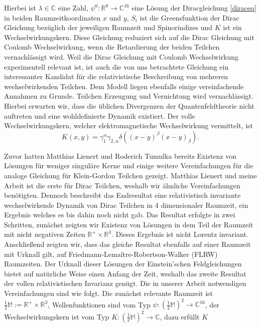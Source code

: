 \documentclass[a4paper,12pt]{article}
\begin{document}
Hierbei ist \(\lambda\in\mathbb{C}\) eine Zahl, \(\psi^0:\mathbb{R}^8\rightarrow \mathbb{C}^{16}\) eine Lösung der Diracgleichung \eqref{diraceq} in beiden 
Raumzeitkoordinaten \(x\) und \(y\), \(S_i\)
ist die Greensfunktion der Dirac Gleichung bezüglich der jeweiligen Raumzeit und Spinorindizes und \(K\) ist ein Wechselwirkungskern.
Diese Gleichung reduziert sich auf die Dirac Gleichung mit Coulomb Wechselwirkung, wenn die Retardierung der beiden Teilchen
vernachlässigt wird. Weil die Dirac Gleichung mit Coulomb Wechselwirkung experimentell relevant ist, ist auch die von uns betrachtete
Gleichung ein interessanter Kandidat für die relativistische Beschreibung von mehreren wechselwirkenden Teilchen.
Dem Modell liegen ebenfalls einige vereinfachende Annahmen zu Grunde. Teilchen Erzeugung und Vernichtung wird vernachlässigt.
Hierbei erwarten wir, dass die üblichen Divergenzen der Quantenfeldtheorie nicht auftreten und eine wohldefinierte Dynamik existiert. 
Der volle Wechselwirkungskern, welcher elektromagnetische Wechselwirkung vermittelt, ist
\begin{equation}
K(x,y)=\gamma_1^\alpha \gamma_{2,\alpha} \delta((x-y)^\beta(x-y)_{\beta}).
\end{equation}

Zuvor hatten Matthias Lienert und Roderich Tumulka bereits Existenz von Lösungen für weniger singuläre Kerne und einige weitere Vereinfachungen
 für die analoge Gleichung für Klein-Gordon
Teilchen gezeigt. Matthias Lienert und meine Arbeit ist die erste für Dirac Teilchen, weshalb wir ähnliche Vereinfachungen benötigten. Dennoch
beschreibt das Endresultat eine relativistisch invariante wechselwirkende Dynamik von Dirac Teilchen in 4 dimensionaler Raumzeit, ein
Ergebnis welches es bis dahin noch nicht gab. Das Resultat erfolgte in zwei Schritten, zunächst zeigten wir Existenz von Lösungen 
in dem Teil der Raumzeit mit nicht negativen Zeiten \(\mathbb{R}^+\times\mathbb{R}^3\). Dieses Ergebnis ist nicht Lorentz invariant.
Anschließend zeigten wir, dass das gleiche Resultat ebenfalls auf einer Raumzeit mit Urknall gilt, auf Friedmann-Lemaître-Robertson-Walker (FLRW)
Raumzeiten. Der Urknall dieser Lösungen der Einstein'schen Feldgleichungen bietet auf natürliche Weise einen Anfang der Zeit, weshalb das zweite
Resultat der vollen relativistischen Invarianz genügt. Die in unserer Arbeit notwendigen
Vereinfachungen sind wie folgt. Die zunächst relevante Raumzeit ist \(\frac{1}{2}\mathbb{M}:=\mathbb{R}^+\times\mathbb{R}^3\), 
Wellenfunktionen sind vom Typ \(\psi: \left(\frac{1}{2}\mathbb{M}\right)^2\rightarrow \mathbb{C}^{16}\), der Wechselwirkungskern ist vom 
Typ \(K:\left(\frac{1}{2}\mathbb{M}\right)^2\rightarrow \mathbb{C}\), dazu erfüllt \(K\) 
\end{document}
